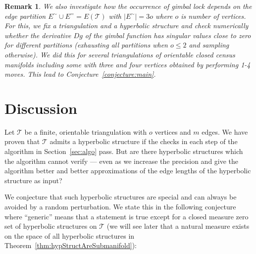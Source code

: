 \documentclass[utopia,fullpage]{nmd/article}
\newcommand{\negSpace}{\!}
\newtheorem{remark}[theorem]{Remark}
\newcommand{\negSpace}{}
\newcommand\trig{\mathcal{T}}
\begin{document}

\begin{remark} \label{remark:experimentEdgePartition}
We also investigate how the occurrence of gimbal lock depends on the edge partition $E^{\sim}\cup E^==E(\trig)$ with $|E^{\sim}|=3o$ where $o$ is number of vertices. For this, we fix a triangulation and a hyperbolic structure and check numerically whether the derivative $Dg$ of the gimbal function has singular values close to zero for different partitions (exhausting all partitions when $o\leq 2$ and sampling otherwise). We did this for several triangulations of orientable closed census manifolds including some with three and four vertices obtained by performing 1-4 moves. This lead to Conjecture~\ref{conjecture:main}.
\end{remark}

\section{Discussion} \label{sec:discussion}

Let $\trig$\negSpace{} be a finite, orientable triangulation with $o$ vertices and $m$ edges.
We have proven that $\trig$\negSpace{} admits a hyperbolic structure if the checks in each step of the algorithm in Section~\ref{sec:algo} pass. But are there hyperbolic structures which the algorithm cannot verify --- even as we increase the precision and give the algorithm better and better approximations of the edge lengths of the hyperbolic structure as input?

We conjecture that such hyperbolic structures are special and can always be avoided by a random perturbation. We state this in the following conjecture where ``generic'' means that a statement is true except for a closed measure zero set of hyperbolic structures on $\trig$ (we will see later that a natural measure exists on the space of all hyperbolic structures in Theorem~\ref{thm:hypStructAreSubmanifold}):
\end{document}
